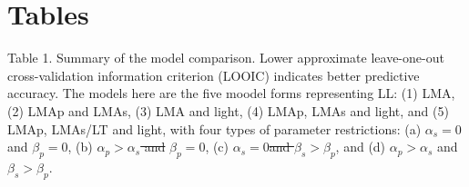 \documentclass[
  12pt,
  a4paper,
,tablecaptionabove
]{scrartcl}
\providecommand{\DIFdeltex}[1]{{\protect\color{red}\sout{#1}}}                      %
\providecommand{\DIFdelbegin}{} %
\providecommand{\DIFdelend}{} %
\providecommand{\DIFdel}[1]{\texorpdfstring{\DIFdeltex{#1}}{}} %
\newcommand{\DIFscaledelfig}{0.5}
\newlength{\DIFdelgraphicswidth} %
\newlength{\DIFdelgraphicsheight} %
\newcommand{\DIFdelincludegraphics}[2][]{%
\sbox{\DIFdelgraphicsbox}{\DIFOincludegraphics[#1]{#2}}%
\settoboxwidth{\DIFdelgraphicswidth}{\DIFdelgraphicsbox} %
\settoboxtotalheight{\DIFdelgraphicsheight}{\DIFdelgraphicsbox} %
\scalebox{\DIFscaledelfig}{%
\parbox[b]{\DIFdelgraphicswidth}{\usebox{\DIFdelgraphicsbox}\\[-\baselineskip] \rule{\DIFdelgraphicswidth}{0em}}\llap{\resizebox{\DIFdelgraphicswidth}{\DIFdelgraphicsheight}{%
\setlength{\unitlength}{\DIFdelgraphicswidth}%
\begin{picture}(1,1)%
\thicklines\linethickness{2pt} %
{\color[rgb]{1,0,0}\put(0,0){\framebox(1,1){}}}%
{\color[rgb]{1,0,0}\put(0,0){\line( 1,1){1}}}%
{\color[rgb]{1,0,0}\put(0,1){\line(1,-1){1}}}%
\end{picture}%
}\hspace*{3pt}}} %
} %
\DeclareRobustCommand{\DIFdelbegin}{\DIFOdelbegin \let\includegraphics\DIFdelincludegraphics} %
\DeclareRobustCommand{\DIFdelend}{\DIFOaddend \let\includegraphics\DIFOincludegraphics} %
\begin{document}
\newpage

\hypertarget{tables}{%
\section{Tables}\label{tables}}

Table 1. Summary of the model comparison. Lower approximate
leave-one-out cross-validation information criterion (LOOIC) indicates
better predictive accuracy. The models here are the five moodel forms
representing LL: (1) LMA, (2) LMAp and LMAs, (3) LMA and light, (4)
LMAp, LMAs and light, and (5) LMAp, LMAs/LT and light, with four types
of parameter restrictions: (a) \(\alpha_s = 0\) and \(\beta_p = 0\), (b)
\DIFdelbegin \DIFdel{\(\alpha_p > \alpha_s\) and }\DIFdelend \(\beta_p = 0\), (c) \(\alpha_s = 0\)\DIFdelbegin \DIFdel{and \(\beta_s > \beta_p\)}\DIFdelend , and (d) \(\alpha_p > \alpha_s\)
and \(\beta_s > \beta_p\).
\end{document}
